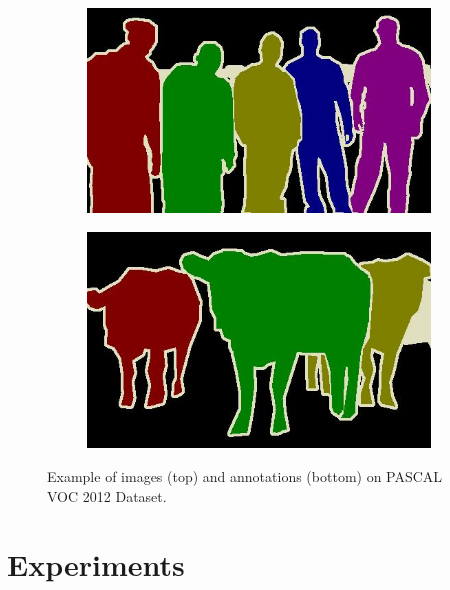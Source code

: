 \begin{figure}[h]
\begin{subfigure}{.25\textwidth}
  \end{subfigure}%
  \begin{subfigure}{.25\textwidth}
    \includegraphics[width=1.\linewidth,height=0.618\linewidth]{figures/pascal_dataset/annotation-3.jpg}
  \end{subfigure}%
  \begin{subfigure}{.25\textwidth}
    \includegraphics[width=1.\linewidth,height=0.618\linewidth]{figures/pascal_dataset/annotation-4.jpg}
  \end{subfigure}
  \caption{Example of images (top) and annotations (bottom) on PASCAL VOC 2012 Dataset.}
  \label{fig:pascal}
\end{figure}



\section{Experiments}

